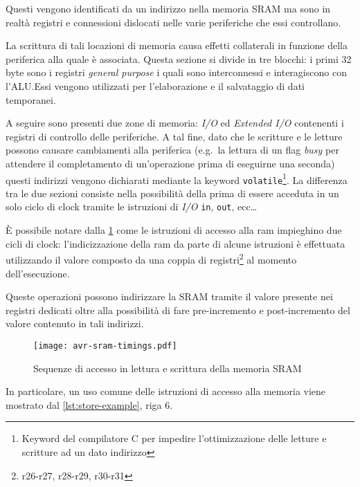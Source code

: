 Questi vengono identificati da un indirizzo nella memoria SRAM ma sono in realtà registri e connessioni dislocati nelle varie periferiche che essi controllano\cite[fig 14-2]{avr:m328p}.

La scrittura di tali locazioni di memoria causa effetti collaterali in funzione della periferica alla quale è associata. Questa sezione si divide in tre blocchi: i primi 32 byte sono i registri \textit{general purpose} i quali sono interconnessi e interagiscono con l'ALU.\@ Essi vengono utilizzati per l'elaborazione e il salvataggio di dati temporanei.

A seguire sono presenti due zone di memoria: \textit{I/O} ed \textit{Extended I/O} contenenti i registri di controllo delle periferiche. A tal fine, dato che le scritture e le letture possono causare cambiamenti alla periferica (e.g.\ la lettura di un flag \textit{busy} per attendere il completamento di un'operazione prima di eseguirne una seconda) questi indirizzi vengono dichiarati mediante la keyword \texttt{volatile}\footnote{Keyword del compilatore C per impedire l'ottimizzazione delle letture e scritture ad un dato indirizzo}. La differenza tra le due sezioni consiste nella possibilità della prima di essere acceduta in un solo ciclo di clock tramite le istruzioni di \textit{I/O} \texttt{in}, \texttt{out}, ecc\ldots

È possibile notare dalla \cref{fig:avr-sram-timings} come le istruzioni di accesso alla ram impieghino due cicli di clock: l'indicizzazione della ram da parte di alcune istruzioni è effettuata utilizzando il valore composto da una coppia di registri\footnote{r26-r27, r28-r29, r30-r31} al momento dell'esecuzione. 

Queste operazioni possono indirizzare la SRAM tramite il valore presente nei registri dedicati oltre alla possibilità di fare pre-incremento e post-incremento del valore contenuto in tali indirizzi.

\begin{figure}[b]
    \centering
    \texttt{[image: avr-sram-timings.pdf]}
    \caption[Immagine rielaborata a partire dalla fig. 8-4 del documento~\cite{avr:m328p}]{Sequenze di accesso in lettura e scrittura della memoria SRAM\cite[fig 8-4]{avr:m328p}}\label{fig:avr-sram-timings}
\end{figure}

In particolare, un uso comune delle istruzioni di accesso alla memoria viene mostrato dal \cref{lst:store-example}, riga 6.

